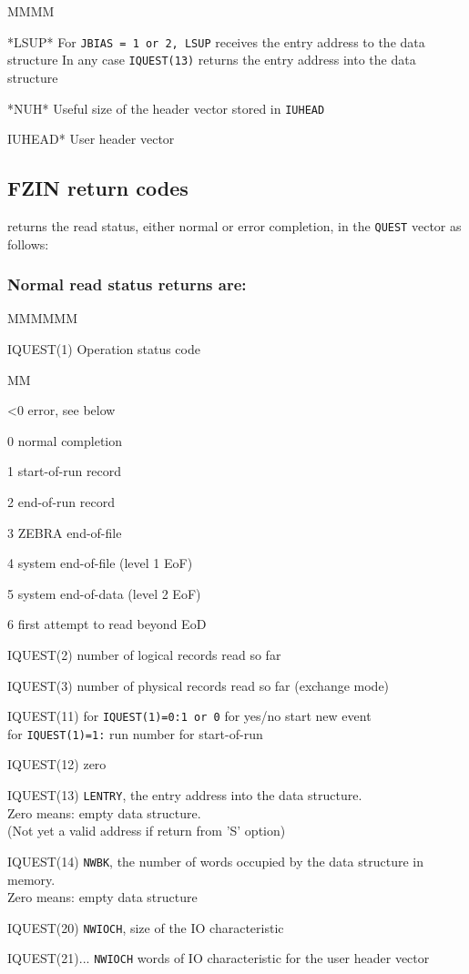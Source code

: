 \Odesc
\begin{DL}{MMMM}
\item[*LSUP*]For {\tt JBIAS = 1 or 2, LSUP} receives
the entry address to the data structure
In any case {\tt IQUEST(13)} returns the entry address
into the data structure
\item[*NUH*]Useful size of the header vector stored in {\tt IUHEAD}
\item[IUHEAD*]User header vector
\end{DL}
\subsection{FZIN return codes}
\par {} returns the read status, either normal or error completion,
in the {\tt QUEST} vector as follows:
\subsubsection{Normal read status returns are:}
\begin{DL}{MMMMMM}
\item[IQUEST(1)]Operation status code
\begin{DL}{MM}
\item[<0]error, see below
\item[ 0]normal completion
\item[ 1]start-of-run record
\item[ 2]end-of-run record
\item[ 3]ZEBRA end-of-file
\item[ 4]system end-of-file  (level 1 EoF)
\item[ 5]system end-of-data  (level 2 EoF)
\item[ 6]first attempt to read beyond EoD
\end{DL}
\item[IQUEST(2)]number of logical records read so far
\item[IQUEST(3)]number of physical records read so far (exchange mode)
\par
\item[IQUEST(11)]for {\tt IQUEST(1)=0:1 or 0} for yes/no start
new event \\
for {\tt IQUEST(1)=1:} run number for start-of-run
\item[IQUEST(12)]zero
\item[IQUEST(13)]{\tt LENTRY}, the entry address into the data structure.\\
Zero means: empty data structure.\\
(Not yet a valid address if return from 'S' option)
\item[IQUEST(14)]{\tt NWBK},
the number of words occupied by the data structure in memory.\\
Zero means: empty data structure
\item[IQUEST(20)]{\tt NWIOCH}, size of the IO characteristic
\item[IQUEST(21)...]{\tt NWIOCH} words of IO characteristic for the user
header vector
\end{DL}
